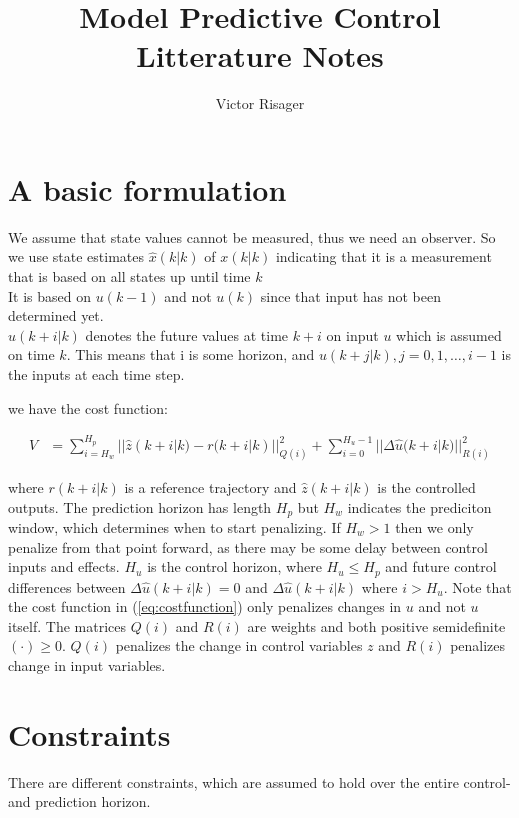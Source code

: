 \documentclass[a4paper]{article}
\title{Model Predictive Control\\
	\large Litterature Notes}
\author{Victor Risager}
\begin{document}
\maketitle

\section{A basic formulation}
We assume that state values cannot be measured, thus we need an observer. So we use state estimates 
$ \hat{x}(k|k) $ of $ x(k|k) $ indicating that it is a measurement that is based on all states up until time $ k $ \\
It is based on $ u(k-1) $ and not $ u(k) $ since that input has not been determined yet. \\
$ \hat{u}(k+i|k) $ denotes the future values at time $ k + i $ on input $ u $ which is assumed on time $ k $. This means that i is some horizon, and  $ u(k+j|k) , j = 0,1, \ldots, i-1 $ is the inputs at each time step.


we have the cost function:

\begin{align} \label{eq:costfunction}
V &= \sum_{i=H_w}^{H_p}{|| \hat{z}(k+i|k) - r(k+i|k)||_{Q(i)}^{2} } + \sum_{i = 0}^{H_u - 1}{|| \Delta \hat{u}(k+i|k)||_{R(i)}^{2} }
\end{align}

where $ r(k+i|k) $ is a reference trajectory and $ \hat{z}(k+i|k) $ is the controlled outputs. The prediction horizon has length $ H_p $ but $ H_w $ indicates the prediciton window, which determines when to start penalizing. If $ H_w > 1 $ then we only penalize from that point forward, as there may be some delay between control inputs and effects. $ H_u $ is the control horizon, where $ H_u \leq H_p $ and future control differences between $ \Delta \hat{u}(k+i|k) = 0 $ and $ \Delta \hat{u}(k+i|k) $ where $ i > H_u $. Note that the cost function in (\ref{eq:costfunction}) only penalizes changes in $ u $ and not  $ u $ itself. The matrices $ Q(i) $ and $ R(i) $ are weights and both positive semidefinite $ (\cdot) \geq 0$. $ Q(i) $ penalizes the change in control variables $ z $ and $ R(i) $ penalizes change in input variables.

\section{Constraints}
There are different constraints, which are assumed to hold over the entire control- and prediction horizon.
\end{document}
